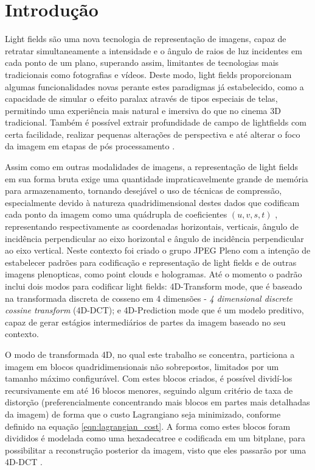\chapter{Introdução}
    Light fields são uma nova tecnologia de representação de imagens, capaz de retratar simultaneamente a intensidade e o ângulo de raios de luz 
    incidentes em cada ponto de um plano, superando assim, limitantes de tecnologias mais tradicionais como fotografias e vídeos. Deste modo,
    light fields proporcionam algumas funcionalidades novas perante estes paradigmas já estabelecido, como a capacidade de simular o efeito paralax
    através de tipos especiais de telas, permitindo uma experiência mais natural e imersiva do que no cinema 3D tradicional. Também é possível
    extrair profundidade de campo de lightfields com certa facilidade, realizar pequenas alterações de perspectiva e até alterar o foco da imagem em
    etapas de pós processamento \cite{lightfields_survey}.
    
    Assim como em outras modalidades de imagens, a representação de light fields em sua forma bruta exige uma quantidade impraticavelmente grande de
    memória para armazenamento, tornando desejável o uso de técnicas de compressão, especialmente devido à natureza quadridimensional destes dados
    que codificam cada ponto da imagem como uma quádrupla de coeficientes $(u, v, s, t)$ \cite{4d_codec}, representando respectivamente as coordenadas horizontais, 
    verticais, ângulo de incidência perpendicular ao eixo horizontal e ângulo de incidência perpendicular ao eixo vertical. Neste contexto foi criado
    o grupo JPEG Pleno com a intenção de estabelecer padrões para codificação e representação de light fields e de outras imagens plenopticas, como
    point clouds e hologramas. Até o momento o padrão inclui dois modos para codificar light fields: 4D-Transform mode, que é baseado na transformada
    discreta de cosseno em 4 dimensões - \textit{4 dimensional discrete cossine transform} (4D-DCT); e 4D-Prediction mode que é um modelo preditivo, 
    capaz de gerar estágios intermediários de partes da imagem baseado no seu contexto.

    O modo de transformada 4D, no qual este trabalho se concentra, particiona a imagem em blocos quadridimensionais não sobrepostos,
    limitados por um tamanho máximo configurável. Com estes blocos criados, é possível dividí-los recursivamente em até 16 blocos menores, seguindo algum
    critério de taxa de distorção (preferencialmente concentrando mais blocos em partes mais detalhadas da imagem) de forma que o custo Lagrangiano seja
    minimizado, conforme definido na equação \ref{eqn:lagrangian_cost}. A forma como estes blocos foram divididos é modelada como uma hexadecatree e
    codificada em um bitplane, para possibilitar a reconstrução posterior da imagem, visto que eles passarão por uma 4D-DCT \cite{4d_codec}.

